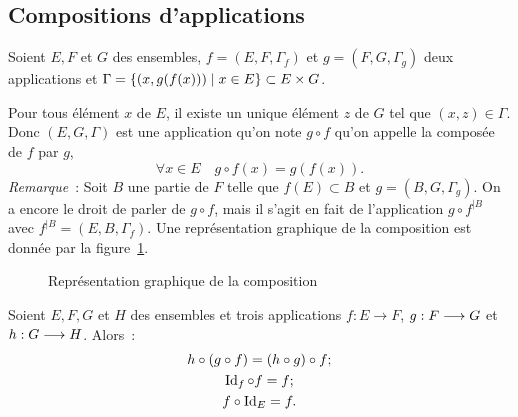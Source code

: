 \subsection{Compositions d'applications}
\label{chap3-subsec:compapp}
\begin{defdef}
    Soient \(E,F\) et \(G\) des ensembles, \(f=(E,F,\Gamma_f)\) et \(g=(F,G, 
    \Gamma_g)\) deux applications et \(\Gamma = \left\{(x,g(f(x)))\mathrel{}\middle|\mathrel{}x \in E\right\} \subset 
    E \times G\).
\end{defdef}
Pour tous élément \(x\) de \(E\), il existe un unique élément \(z\) de \(G\) tel 
que \((x,z) \in \Gamma\). Donc \((E,G,\Gamma)\) est une application qu'on note 
\(g \circ f\) qu'on appelle la composée de \(f\) par \(g\),
\begin{equation}
    \forall x \in E \quad g \circ f(x)=g(f(x)).
\end{equation}
\emph{Remarque}~: Soit \(B\) une partie de \(F\) telle que \(f(E) \subset B\) et 
\(g=(B,G,\Gamma_g)\). On a encore le droit de parler de \(g \circ f\), mais il 
s'agit en fait de l'application \(g \circ f^{|B}\) avec \( f^{|B} 
=(E,B,\Gamma_f)\).
Une représentation graphique de la composition est donnée par la 
figure~\ref{chap3-fig:compose}.
\begin{figure}
    \centering
    \caption{Représentation graphique de la composition}
    \label{chap3-fig:compose}
\end{figure}
\begin{prop}
    Soient \(E,F,G\) et \(H\) des ensembles et trois applications \(f:E 
    \longrightarrow F\), \(g:F \longrightarrow G\) et \(h:G \longrightarrow H\). 
    Alors~:
    \begin{gather}
        h \circ (g \circ f)=(h \circ g) \circ f;\\
        \operatorname{Id}_f \circ f = f;\\
        f \circ \operatorname{Id}_E=f.
    \end{gather}
\end{prop}
